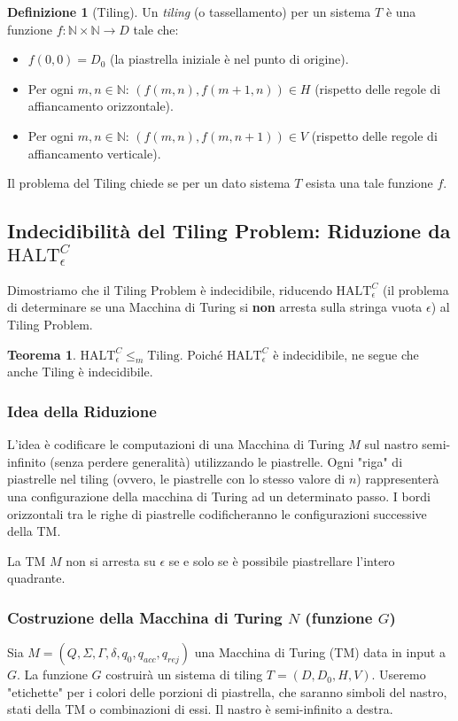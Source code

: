 \documentclass[a4paper]{article}
\theoremstyle{definition} %
\newtheorem{theorem}{Teorema}
\newtheorem{definition}{Definizione}
\begin{document}
\begin{definition}[Tiling]
Un \emph{tiling} (o tassellamento) per un sistema $T$ è una funzione $f: \mathbb{N} \times \mathbb{N} \to D$ tale che:
\begin{itemize}
    \item $f(0,0) = D_0$ (la piastrella iniziale è nel punto di origine).
    \item Per ogni $m, n \in \mathbb{N}$: $(f(m,n), f(m+1,n)) \in H$ (rispetto delle regole di affiancamento orizzontale).
    \item Per ogni $m, n \in \mathbb{N}$: $(f(m,n), f(m,n+1)) \in V$ (rispetto delle regole di affiancamento verticale).
\end{itemize}
Il problema del Tiling chiede se per un dato sistema $T$ esista una tale funzione $f$.
\end{definition}

\subsection{Indecidibilit\`a del Tiling Problem: Riduzione da $\text{HALT}_\epsilon^C$}
Dimostriamo che il Tiling Problem è indecidibile, riducendo $\text{HALT}_\epsilon^C$ (il problema di determinare se una Macchina di Turing si \textbf{non} arresta sulla stringa vuota $\epsilon$) al Tiling Problem.

\begin{theorem}
$\text{HALT}_\epsilon^C \le_m \text{Tiling}$. Poiché $\text{HALT}_\epsilon^C$ è indecidibile, ne segue che anche $\text{Tiling}$ è indecidibile.
\end{theorem}

\subsubsection{Idea della Riduzione}
L'idea è codificare le computazioni di una Macchina di Turing $M$ sul nastro semi-infinito (senza perdere generalità) utilizzando le piastrelle. Ogni "riga" di piastrelle nel tiling (ovvero, le piastrelle con lo stesso valore di $n$) rappresenterà una configurazione della macchina di Turing ad un determinato passo. I bordi orizzontali tra le righe di piastrelle codificheranno le configurazioni successive della TM.

La TM $M$ non si arresta su $\epsilon$ se e solo se è possibile piastrellare l'intero quadrante.

\subsubsection{Costruzione della Macchina di Turing $N$ (funzione $G$)}
Sia $M = (Q, \Sigma, \Gamma, \delta, q_0, q_{acc}, q_{rej})$ una Macchina di Turing (TM) data in input a $G$. La funzione $G$ costruirà un sistema di tiling $T=(D, D_0, H, V)$.
Useremo "etichette" per i colori delle porzioni di piastrella, che saranno simboli del nastro, stati della TM o combinazioni di essi. Il nastro è semi-infinito a destra.
\end{document}
